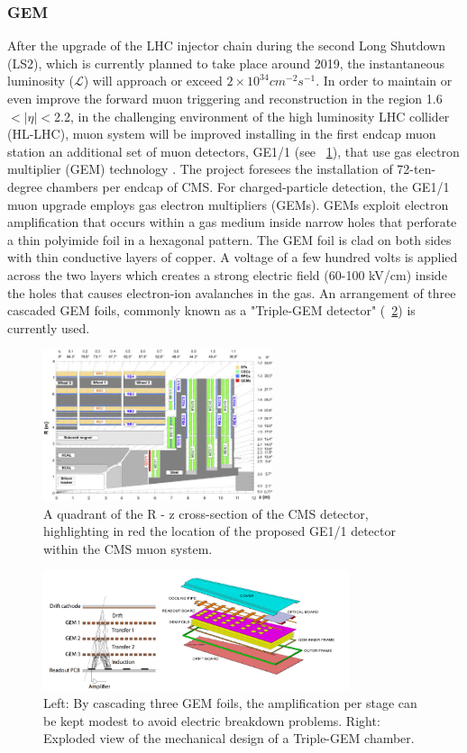 \subsubsection{GEM}
After the upgrade of the LHC injector chain during the second Long Shutdown (LS2), which is currently planned to take place around 2019, the instantaneous luminosity ($\mathcal{L}$) will approach or exceed $2\times10^{34} cm^{-2}s^{-1}$. In order to maintain or even improve the forward muon triggering and reconstruction in the region 1.6$<|\eta|<$2.2, in the challenging environment of the high luminosity LHC collider (HL-LHC), muon system will be improved installing in the first endcap muon station an additional set of muon detectors, GE1/1 (see \figurename~\ref{GEM}), that use gas electron multiplier (GEM) technology \cite{GEM}. The project foresees the installation of 72-ten-degree chambers per endcap of CMS. For charged-particle detection, the GE1/1 muon upgrade employs gas electron multipliers (GEMs). GEMs exploit electron amplification that occurs within a gas medium inside narrow holes that perforate a thin polyimide foil in a hexagonal pattern. The GEM foil is clad on both sides with thin conductive layers of copper. A voltage of a few hundred volts is applied across the two layers which creates a strong electric field (60-100 kV/cm) inside the holes that causes electron-ion avalanches in the gas. An arrangement of three cascaded GEM foils, commonly known as a "Triple-GEM detector" (\figurename~\ref{TripleGEM}) is currently used.
\begin{figure}[h!]
\centering
\includegraphics[width=0.6\textwidth]{Images/GEM}
\caption{A quadrant of the R - z cross-section of the CMS detector, highlighting in red the location of the proposed GE1/1 detector within the CMS muon system.}
\label{GEM}
\end{figure}
\begin{figure}[h!]
\centering
\includegraphics[width=0.8\textwidth]{Images/TripleGEM}
\caption{Left: By cascading three GEM foils, the amplification per stage can be kept modest to avoid electric breakdown problems. Right: Exploded view of the mechanical design of a Triple-GEM chamber.}
\label{TripleGEM}
\end{figure}
 

